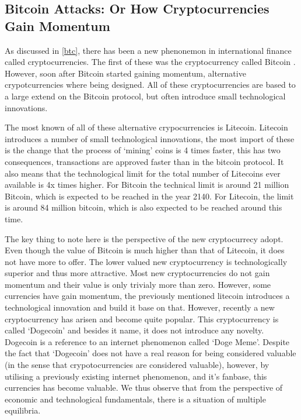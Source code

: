 \begin{refsection}
\chapter{Bitcoin Attacks: Or How Cryptocurrencies Gain Momentum}
As discussed in \autoref{btc}, there has been a new phenonemon in international finance called cryptocurrencies. The first of these was the cryptocurrency called Bitcoin \parencite{nakamoto2008bitcoin}. However, soon after Bitcoin started gaining momentum, alternative crypotcurrencies where being designed. All of these cryptocurrencies are based to a large extend on the Bitcoin protocol, but often introduce small technological innovations.

The most known of all of these alternative crypocurrencies is Litecoin. Litecoin introduces a number of small technological innovations, the most import of these is the change that the process of `mining' coins is 4 times faster, this has two consequences, transactions are approved faster than in the bitcoin protocol. It also means that the technological limit for the total number of Litecoins ever available is 4x times higher. For Bitcoin the technical limit is around 21 million Bitcoin, which is expected to be reached in the year 2140. For Litecoin, the limit is around 84 million bitcoin, which is also expected to be reached around this time.

The key thing to note here is the perspective of the new cryptocurrecy adopt. Even though the value of Bitcoin is much higher than that of Litecoin, it does not have more to offer. The lower valued new cryptocurrency is technologically superior and thus more attractive. Most new cryptocurrencies do not gain momentum and their value is only trivialy more than zero. However, some currencies have gain momentum, the previously mentioned litecoin introduces a technological innovation and build it base on that. However, recently a new cryptocurrency has arisen and become quite popular. This cryptocurrency is called `Dogecoin' and besides it name, it does not introduce any novelty. Dogecoin is a reference to an internet phenomenon called `Doge Meme'. Despite the fact that `Dogecoin' does not have a real reason for being considered valuable (in the sense that crypotocurrencies are considered valuable), however, by utilising a previously existing internet phenomenon, and it's fanbase, this currencies has become valuable. We thus observe that from the perspective of economic and technological fundamentals, there is a situation of multiple equilibria.


\end{refsection}
